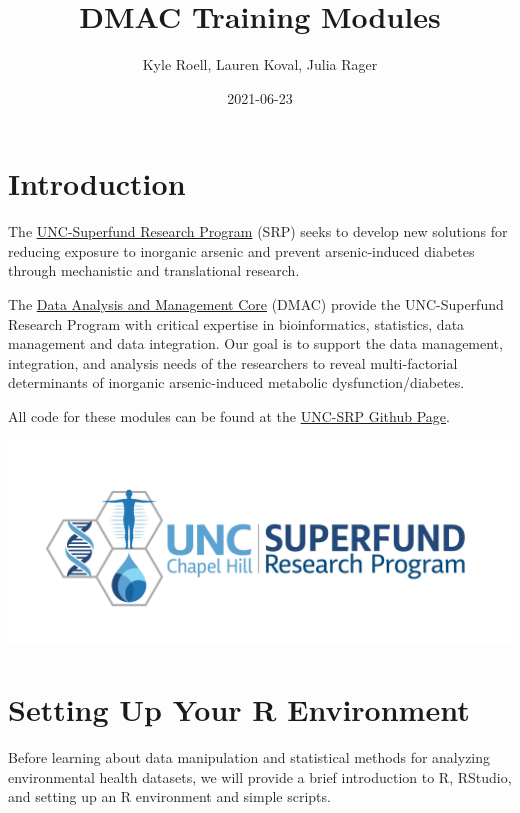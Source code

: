 \documentclass[
]{book}
\title{DMAC Training Modules}
\author{Kyle Roell, Lauren Koval, Julia Rager}
\date{2021-06-23}
\begin{document}
\maketitle

{
\setcounter{tocdepth}{1}
\tableofcontents
}
\hypertarget{introduction}{%
\chapter{Introduction}\label{introduction}}

The \href{https://sph.unc.edu/superfund-pages/srp/}{UNC-Superfund Research Program} (SRP) seeks to develop new solutions for reducing exposure to inorganic arsenic and prevent arsenic-induced diabetes through mechanistic and translational research.

The \href{https://sph.unc.edu/superfund-pages/dmac/}{Data Analysis and Management Core} (DMAC) provide the UNC-Superfund Research Program with critical expertise in bioinformatics, statistics, data management and data integration. Our goal is to support the data management, integration, and analysis needs of the researchers to reveal multi-factorial determinants of inorganic arsenic-induced metabolic dysfunction/diabetes.

All code for these modules can be found at the \href{https://github.com/UNCSRP}{UNC-SRP Github Page}.

\includegraphics[width=45.58in]{_book/test1_files/figure-html/SRP_logo}

\hypertarget{intro}{%
\chapter{Setting Up Your R Environment}\label{intro}}

Before learning about data manipulation and statistical methods for analyzing environmental health datasets, we will provide a brief introduction to R, RStudio, and setting up an R environment and simple scripts.
\end{document}
